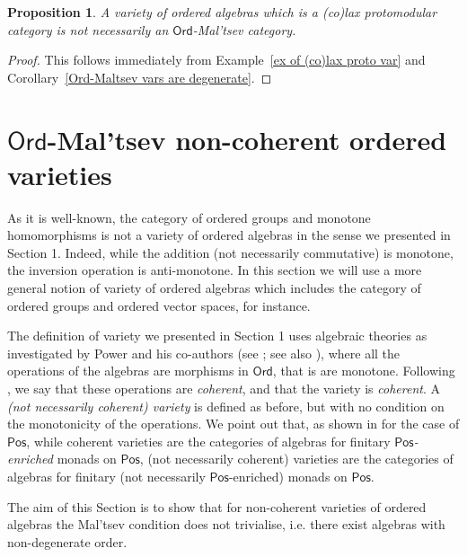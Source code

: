 \documentclass[11pt]{amsart}
\theoremstyle{plain}
\newtheorem{proposition}[subsection]{Proposition}
\theoremstyle{definition}
\theoremstyle{remark}
\newcommand{\Ord}{\ensuremath{\mathsf{Ord}}}
\newcommand{\Pos}{\ensuremath{\mathsf{Pos}}}
\begin{document}
\begin{proposition}\label{Ord-proto does not imply Ord-Maltsev} A variety of ordered algebras which is a (co)lax protomodular category is not necessarily an $\Ord$-Mal'tsev category.
\end{proposition}
\begin{proof} This follows immediately from Example~\ref{ex of (co)lax proto var} and Corollary~\ref{Ord-Maltsev vars are degenerate}.
\end{proof}


\section{\Ord-Mal'tsev non-coherent ordered varieties}\label{Section: non-coherent}
As it is well-known, the category of ordered groups and monotone homomorphisms is not a variety of ordered algebras in the sense we presented in Section 1. Indeed, while the addition (not necessarily commutative) is monotone, the inversion operation is anti-monotone. In this section we will use a more general notion of variety of ordered algebras which includes the category of ordered groups and ordered vector spaces, for instance.

The definition of variety we presented in Section 1 uses algebraic theories as investigated by Power and his co-authors (see \cite{Power, NPower, PPower}; see also \cite{LR}), where all the operations of the algebras are morphisms in $\Ord$, that is are monotone. Following \cite{Adamek-Milius}, we say that these operations are \emph{coherent}, and that the variety is \emph{coherent}. A \emph{(not necessarily coherent) variety} is defined as before, but with no condition on the monotonicity of the operations. We point out that, as shown in \cite{Adamek-Milius} for the case of $\Pos$, while coherent varieties are the categories of algebras for finitary \emph{$\Pos$-enriched} monads on $\Pos$, (not necessarily coherent) varieties are the categories of algebras for finitary (not necessarily $\Pos$-enriched) monads on $\Pos$.

The aim of this Section is to show that for non-coherent varieties of ordered algebras the Mal'tsev condition does not trivialise, i.e. there exist algebras with non-degenerate order.
\end{document}
